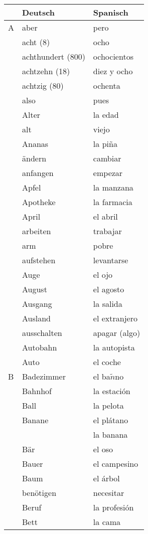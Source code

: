 \documentclass{spanish_summary}
\begin{document}
\begin{longtable}{p{} p{} | p{}} 
~ & \textbf{Deutsch}     & \textbf{Spanisch}                                       \\ \hline
\hline
\endhead %
A & aber & pero  \\
& acht (8) & ocho  \\
& achthundert (800) & ochocientos \\
& achtzehn (18) & diez y ocho  \\
& achtzig (80) & ochenta  \\
& also & pues  \\
& Alter & la edad  \\
& alt & viejo  \\
& Ananas & la pi\~{n}a  \\
& ändern & cambiar \\
& anfangen & empezar  \\
& Apfel & la manzana \\
& Apotheke & la farmacia  \\
& April & el abril   \\
& arbeiten & trabajar  \\
& arm & pobre \\
& aufstehen & levantarse \\
& Auge & el ojo  \\
& August & el agosto  \\
& Ausgang & la salida  \\
& Ausland & el extranjero \\
& ausschalten & apagar (algo)  \\
& Autobahn & la autopista \\
& Auto & el coche  \\
B & Badezimmer & el ba$\tilde{n}$no  \\
& Bahnhof & la estación \\
& Ball & la pelota  \\
& Banane & el plátano  \\
& & la banana \\ 
& Bär & el oso \\
& Bauer & el campesino  \\
& Baum & el árbol \\
& benötigen & necesitar  \\
& Beruf & la profesión  \\
& Bett & la cama  \\

\end{longtable}
\end{document}
